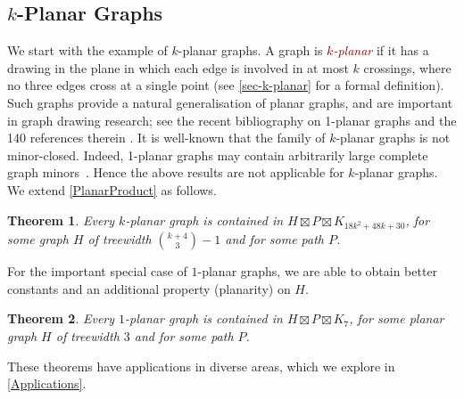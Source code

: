 \documentclass{patmorin}
\theoremstyle{plain}
\newtheorem{thm}{Theorem}
\theoremstyle{definition}
\newcommand{\defin}[1]{\textcolor{Maroon}{\emph{#1}}}
\newcommand{\note}[2]{\noindent{\color{red}[#1:~#2]}}
\begin{document}
\subsection{$k$-Planar Graphs}
\label{k_planar_section}

We start with the example of $k$-planar graphs. A graph is \defin{$k$-planar} if it has a drawing in the plane in which each edge is involved in at most $k$ crossings, where no three edges cross at a single point (see \cref{sec-k-planar} for a formal definition). Such graphs provide a natural generalisation of planar graphs, and are important in graph drawing research; see the recent bibliography on 1-planar graphs and the 140 references therein \citep{kobourov.liotta.ea:annotated}. It is well-known that the family of $k$-planar graphs is not minor-closed.  Indeed, 1-planar graphs may contain arbitrarily large complete graph minors~\citep{dujmovic.eppstein.ea:structure}. Hence the above results are not applicable for  $k$-planar graphs. We extend \cref{PlanarProduct} as follows.

\begin{thm}
\label{kPlanarProduct}
Every $k$-planar graph is contained in $H\boxtimes P\boxtimes K_{18k^2+48k+30}$, for some graph $H$ of treewidth $\binom{k+4}{3}-1$ and for some path $P$.
\end{thm}



For the important special case of $1$-planar graphs, we are able to obtain better constants and an additional property (planarity) on $H$.

\begin{thm}\label{1_planar_product}
  Every $1$-planar graph is contained in $H\boxtimes P\boxtimes K_{7}$, for some planar graph $H$ of treewidth $3$ and for some path $P$.
\end{thm}

These theorems have applications in diverse areas, which we explore in \cref{Applications}.
\end{document}
